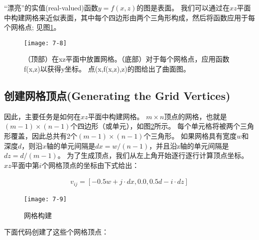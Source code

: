 \begin{flushleft}
“漂亮”的实值(real-valued)函数$y=f(x,z)$的图是表面。 我们可以通过在$xz$平面中构建网格来近似表面，其中每个四边形由两个三角形构成，然后将函数应用于每个网格点; 见图\ref{fig:7-8}。
\end{flushleft}

\begin{figure}[h]
    \texttt{[image: 7-8]}
    \centering
    \caption{（顶部）在xz平面中放置网格。（底部）对于每个网格点，应用函数f(x,z)以获得y坐标。 点(x,f(x,z),z)的图给出了曲面图。}
    \label{fig:7-8}
\end{figure}

\subsection{创建网格顶点(Generating the Grid Vertices)}
\begin{flushleft}
因此，主要任务是如何在$xz$平面中构建网格。 $m\times n$顶点的网格，也就是$(m-1)\times(n-1)$个四边形（或单元），如图\ref{fig:7-9}所示。 每个单元格将被两个三角形覆盖，因此总共有2个$(m-1)\times(n-1)$个三角形。 如果网格具有宽度$w$和深度$d$，则沿$x$轴的单元间隔是$dx=w/(n-1)$，并且沿z轴的单元间隔是$dz=d/(m-1)$。 为了生成顶点，我们从左上角开始逐行逐行计算顶点坐标。 $xz$平面中第$i$个网格顶点的坐标由下式给出：\\
\end{flushleft}

\begin{align*}
v_{ij}=[-0.5w+j\cdot dx,0.0,0.5d-i\cdot dz]
\end{align*}

\begin{figure}[h]
    \texttt{[image: 7-9]}
    \centering
    \caption{网格构建}
    \label{fig:7-9}
\end{figure}

\begin{flushleft}
下面代码创建了这些个网格顶点：\\
\end{flushleft}

